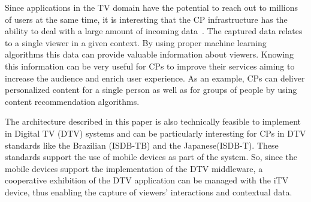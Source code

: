 \documentclass[conference,a4paper]{IEEEtran}
\begin{document}
Since applications in the TV domain have the potential to reach out to millions of users at the same time, it is interesting that the CP infrastructure has the ability to deal with a large amount of incoming data~\cite{Lee2010}. The captured data relates to a single viewer in a given context. By using proper machine learning algorithms this data can provide valuable information about viewers. Knowing this information can be very useful for CPs to improve their services aiming to increase the audience and enrich user experience. As an example, CPs can deliver personalized content for a single person as well as for groups of people by using content recommendation algorithms.

The architecture described in this paper is also technically feasible to implement in Digital TV (DTV) systems and can be particularly interesting for CPs in DTV standards like the Brazilian (ISDB-TB) and the Japanese(ISDB-T). These standards support the use of mobile devices as part of the system. So, since the mobile devices support the implementation of the DTV middleware, a cooperative exhibition of the DTV application can be managed with the iTV device, thus enabling the capture of viewers' interactions and contextual data.



\end{document}
